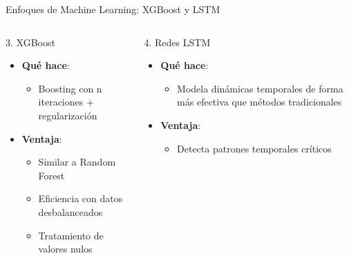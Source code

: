 \begin{frame}{Enfoques de Machine Learning: XGBoost y LSTM}
    \begin{columns}[T]
        \begin{column}{0.48\textwidth}
            \begin{alertblock}{3. XGBoost}
                \begin{itemize}
                    
                    \item \textbf{Qué hace}: 
                    \begin{itemize}
                        
                        \item Boosting con n iteraciones + regularización
                    \end{itemize}
                    \item \textbf{Ventaja}: 
                    \begin{itemize}
                        \item Similar a Random Forest
                        \item Eficiencia con datos desbalanceados
                        \item Tratamiento de valores nulos
                    \end{itemize}
                \end{itemize}
            \end{alertblock}
        \end{column}
        
        \begin{column}{0.48\textwidth}
            \begin{alertblock}{4. Redes LSTM}
                \begin{itemize}
                    
                    \item \textbf{Qué hace}: 
                    \begin{itemize}
                        
                        \item Modela dinámicas temporales de forma más efectiva que métodos tradicionales
                    \end{itemize}
                    \item \textbf{Ventaja}: 
                    \begin{itemize}
                        
                        \item Detecta patrones temporales críticos 
                    \end{itemize}
                \end{itemize}
            \end{alertblock}
        \end{column}
    \end{columns}

\end{frame}